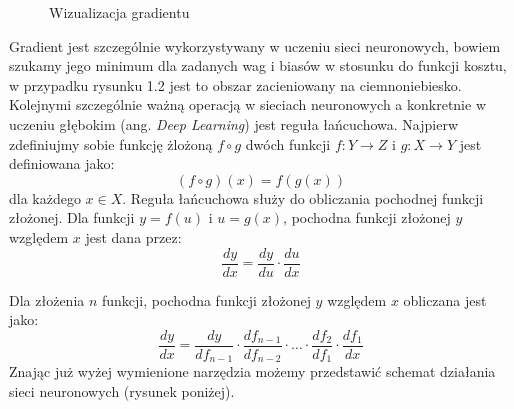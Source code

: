 \begin{enumerate}
\begin{figure}[h]
\caption{Wizualizacja gradientu}
\end{figure}
Gradient jest szczególnie wykorzystywany w uczeniu sieci neuronowych, bowiem szukamy jego minimum dla zadanych wag i biasów w stosunku do funkcji kosztu, w przypadku rysunku 1.2 jest to obszar zacieniowany na ciemnoniebiesko.
Kolejnymi szczególnie ważną operacją w sieciach neuronowych a konkretnie w uczeniu głębokim (ang. \textit{Deep Learning}) jest reguła łańcuchowa. Najpierw zdefiniujmy sobie funkcję żlożoną \(f \circ g\) dwóch funkcji \(f: Y \rightarrow Z\) i \(g: X \rightarrow Y\) jest definiowana jako:
\begin{equation}
    (f \circ g)(x) = f(g(x))
\end{equation}
dla każdego \(x \in X\).
Reguła łańcuchowa służy do obliczania pochodnej funkcji złożonej. Dla funkcji \(y = f(u)\) i \(u = g(x)\), pochodna funkcji złożonej \(y\) względem \(x\) jest dana przez:
\begin{equation}
    \frac{dy}{dx} = \frac{dy}{du} \cdot \frac{du}{dx}
\end{equation}

Dla złożenia \(n\) funkcji, pochodna funkcji złożonej \(y\) względem \(x\) obliczana jest jako:
\begin{equation}
    \frac{dy}{dx} = \frac{dy}{df_{n-1}} \cdot \frac{df_{n-1}}{df_{n-2}} \cdot \ldots \cdot \frac{df_2}{df_1} \cdot \frac{df_1}{dx}
\end{equation}
Znając już wyżej wymienione narzędzia możemy przedstawić schemat działania sieci neuronowych (rysunek poniżej). 
\begin{figure}[htbp]
\centering
{}
\end{figure}
\end{enumerate}
